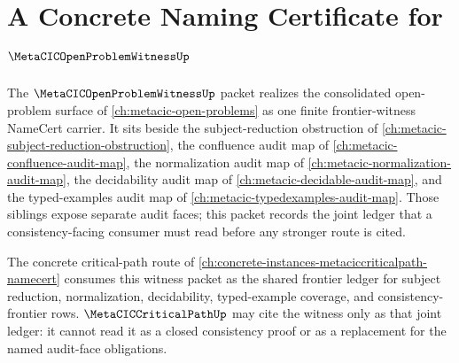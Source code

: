 \chapter{A Concrete Naming Certificate for $\MetaCICOpenProblemWitnessUp$}
\label{ch:concrete-instances-metacicopenproblemwitness-namecert}

The $\MetaCICOpenProblemWitnessUp$ packet realizes the consolidated open-problem surface of \autoref{ch:metacic-open-problems} as one finite frontier-witness NameCert carrier. It sits beside the subject-reduction obstruction of \autoref{ch:metacic-subject-reduction-obstruction}, the confluence audit map of \autoref{ch:metacic-confluence-audit-map}, the normalization audit map of \autoref{ch:metacic-normalization-audit-map}, the decidability audit map of \autoref{ch:metacic-decidable-audit-map}, and the typed-examples audit map of \autoref{ch:metacic-typedexamples-audit-map}. Those siblings expose separate audit faces; this packet records the joint ledger that a consistency-facing consumer must read before any stronger route is cited.

The concrete critical-path route of \autoref{ch:concrete-instances-metaciccriticalpath-namecert} consumes this witness packet as the shared frontier ledger for subject reduction, normalization, decidability, typed-example coverage, and consistency-frontier rows. $\MetaCICCriticalPathUp$ may cite the witness only as that joint ledger: it cannot read it as a closed consistency proof or as a replacement for the named audit-face obligations.

